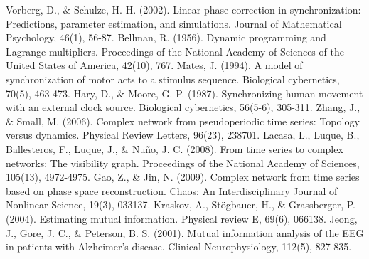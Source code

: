 \documentclass[12pt]{article}
\begin{document}
\begin{thebibliography}{}
    Vorberg, D., \& Schulze, H. H. (2002). Linear phase-correction in synchronization: Predictions, parameter estimation, and simulations. Journal of Mathematical Psychology, 46(1), 56-87.
    Bellman, R. (1956). Dynamic programming and Lagrange multipliers. Proceedings of the National Academy of Sciences of the United States of America, 42(10), 767.
    Mates, J. (1994). A model of synchronization of motor acts to a stimulus sequence. Biological cybernetics, 70(5), 463-473.
    Hary, D., \& Moore, G. P. (1987). Synchronizing human movement with an external clock source. Biological cybernetics, 56(5-6), 305-311.
    Zhang, J., \& Small, M. (2006). Complex network from pseudoperiodic time series: Topology versus dynamics. Physical Review Letters, 96(23), 238701.
    Lacasa, L., Luque, B., Ballesteros, F., Luque, J., \& Nuño, J. C. (2008). From time series to complex networks: The visibility graph. Proceedings of the National Academy of Sciences, 105(13), 4972-4975.
    Gao, Z., \& Jin, N. (2009). Complex network from time series based on phase space reconstruction. Chaos: An Interdisciplinary Journal of Nonlinear Science, 19(3), 033137.
    Kraskov, A., Stögbauer, H., \& Grassberger, P. (2004). Estimating mutual information. Physical review E, 69(6), 066138.
    Jeong, J., Gore, J. C., \& Peterson, B. S. (2001). Mutual information analysis of the EEG in patients with Alzheimer's disease. Clinical Neurophysiology, 112(5), 827-835.
\end{thebibliography}
\end{document}
